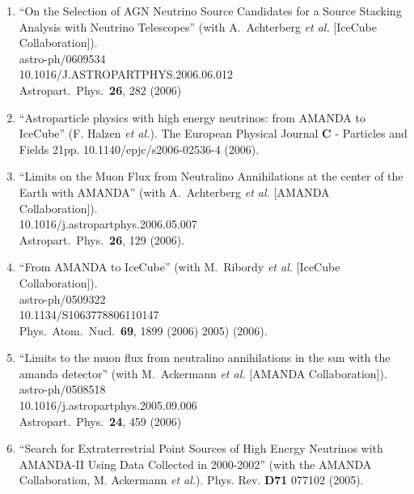 \begin{enumerate}
\item ``On the Selection of AGN Neutrino Source Candidates
        for a Source   Stacking Analysis with Neutrino
        Telescopes'' (with A.~Achterberg {\it     {\it et
        al.}}  [IceCube Collaboration]).
        \\{}astro-ph/0609534
        \\{}10.1016/J.ASTROPARTPHYS.2006.06.012
        \\{}Astropart.\ Phys.\ {\bf     26}, 282 (2006)

\item ``Astroparticle physics with high energy neutrinos:
        from AMANDA to   IceCube'' (F. Halzen {\it et al.}).
        The European Physical Journal {\bf C} -   Particles
        and Fields  21pp. 10.1140/epjc/s2006-02536-4 (2006).

\item ``Limits on the Muon Flux from Neutralino
        Annihilations at the center   of the Earth with
        AMANDA'' (with A.~Achterberg {\it et al.}  [AMANDA
        Collaboration]).
        \\{}10.1016/j.astropartphys.2006.05.007
        \\{}Astropart.\ Phys.\ {\bf 26}, 129 (2006).

\item ``From AMANDA to IceCube'' (with M.~Ribordy {\it et
        al.}  [IceCube   Collaboration]).
        \\{}astro-ph/0509322 \\{}10.1134/S1063778806110147
        \\{}Phys.\ Atom.\ Nucl.\ {\bf 69}, 1899 (2006) %
        2005)  (2006).

\item ``Limits to the muon flux from neutralino
        annihilations in the sun   with the amanda
        detector'' (with M.~Ackermann {\it et al.}  [AMANDA
        Collaboration]).  \\{}astro-ph/0508518
        \\{}10.1016/j.astropartphys.2005.09.006
        \\{}Astropart.\ Phys.\ {\bf     24}, 459 (2006)

\item ``Search for Extraterrestrial Point Sources of High
        Energy   Neutrinos with AMANDA-II Using Data
        Collected in 2000-2002'' (with the   AMANDA
        Collaboration, M. Ackermann {\it et al.}).  Phys.
        Rev. {\bf D71}   077102 (2005).


\end{enumerate}
